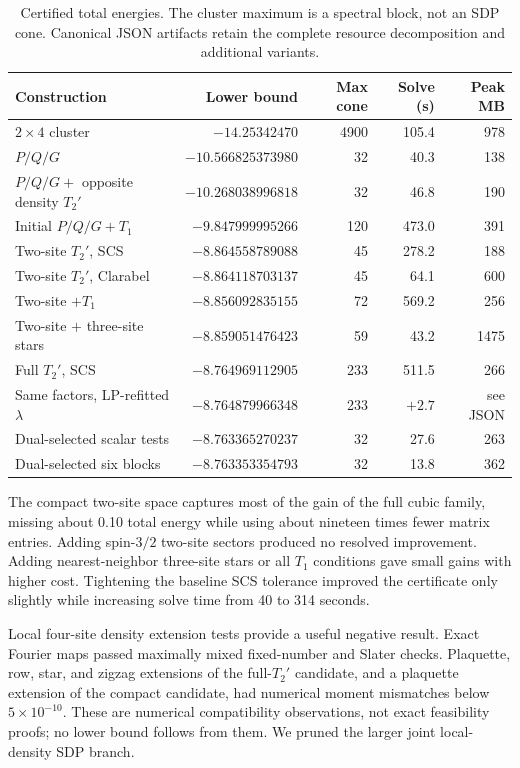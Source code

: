 \documentclass[11pt]{article}
\begin{document}
\begin{table}[ht]
\centering\small
\begin{tabular}{lrrrr}
\toprule
Construction & Lower bound & Max cone & Solve (s) & Peak MB\\
\midrule
$2\times4$ cluster & $-14.25342470$ & 4900 & 105.4 & 978\\
$P/Q/G$ & $-10.566825373980$ & 32 & 40.3 & 138\\
$P/Q/G+$ opposite density $T_2'$ & $-10.268038996818$ & 32 & 46.8 & 190\\
Initial $P/Q/G+T_1$ & $-9.847999995266$ & 120 & 473.0 & 391\\
Two-site $T_2'$, SCS & $-8.864558789088$ & 45 & 278.2 & 188\\
Two-site $T_2'$, Clarabel & $-8.864118703137$ & 45 & 64.1 & 600\\
Two-site $+T_1$ & $-8.856092835155$ & 72 & 569.2 & 256\\
Two-site $+$ three-site stars & $-8.859051476423$ & 59 & 43.2 & 1475\\
Full $T_2'$, SCS & $-8.764969112905$ & 233 & 511.5 & 266\\
Same factors, LP-refitted $\lambda$ & $-8.764879966348$ & 233 & $+2.7$ & see JSON\\
Dual-selected scalar tests & $-8.763365270237$ & 32 & 27.6 & 263\\
Dual-selected six blocks & $-8.763353354793$ & 32 & 13.8 & 362\\
\bottomrule
\end{tabular}
\caption{Certified total energies. The cluster maximum is a spectral block, not an SDP cone. Canonical JSON artifacts retain the complete resource decomposition and additional variants.}\label{tab:bounds}
\end{table}

The compact two-site space captures most of the gain of the full cubic family, missing about 0.10 total energy while using about nineteen times fewer matrix entries. Adding spin-$3/2$ two-site sectors produced no resolved improvement. Adding nearest-neighbor three-site stars or all $T_1$ conditions gave small gains with higher cost. Tightening the baseline SCS tolerance improved the certificate only slightly while increasing solve time from 40 to 314 seconds.

Local four-site density extension tests provide a useful negative result. Exact Fourier maps passed maximally mixed fixed-number and Slater checks. Plaquette, row, star, and zigzag extensions of the full-$T_2'$ candidate, and a plaquette extension of the compact candidate, had numerical moment mismatches below $5\times10^{-10}$. These are numerical compatibility observations, not exact feasibility proofs; no lower bound follows from them. We pruned the larger joint local-density SDP branch.
\end{document}
